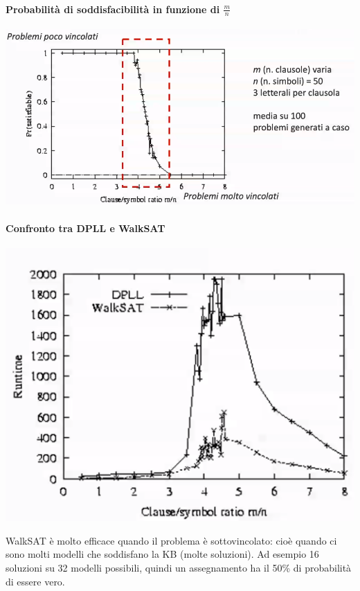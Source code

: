 \documentclass[10pt]{book}
\begin{document}
\paragraph{Probabilità di soddisfacibilità in funzione di $\frac{m}{n}$}
\begin{center}
	\includegraphics[scale=0.7]{sat_grafico.png}
\end{center}
\paragraph{Confronto tra DPLL e WalkSAT}
\begin{center}
	\includegraphics[scale=0.7]{dpllwalksat_confronto.png}
\end{center}
WalkSAT è molto efficace quando il problema è sottovincolato: cioè quando ci sono molti modelli che soddisfano la KB (molte soluzioni). Ad esempio 16 soluzioni su 32 modelli possibili, quindi un assegnamento ha il 50\% di probabilità di essere vero.
\end{document}
